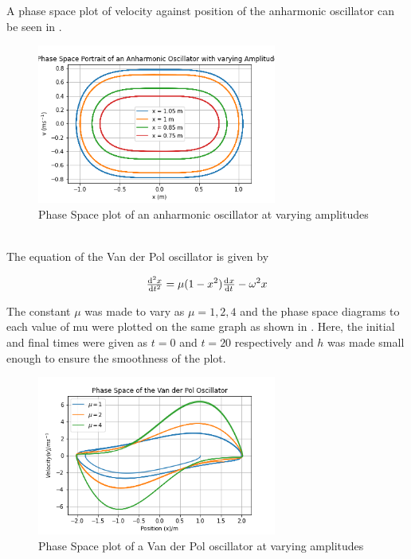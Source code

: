 \documentclass[11pt]{article}
\begin{document}
	A phase space plot of velocity against position of the anharmonic oscillator can be seen in .
	\begin{figure}[!h]\begin{center} 
			\vspace{12pt}
			\includegraphics[width=0.7\textwidth]{phase_space.png} 
			\caption{Phase Space plot of an anharmonic oscillator at varying amplitudes }
			\label{fig:phase_space} 
		\end{center}
	\end{figure}
\\
	The equation of the Van der Pol oscillator is given by
	
	\begin{equation}
		\od[2]{x}{t} = \mu (1-x^{2})\od{x}{t} - \omega^{2} x
	\end{equation}



	The constant $\mu$ was made to vary as $\mu = 1, 2, 4$ and the phase space diagrams to each value of mu were plotted on the same graph as shown in . Here, the initial and final times were given as $t=0$ and $t=20$ respectively and $h$ was made small enough to ensure the smoothness of the plot. 
	\begin{figure}[!h]\begin{center} 
			\vspace{12pt}
			\includegraphics[width=0.7\textwidth]{vanderpol.png} 
			\caption{Phase Space plot of a Van der Pol oscillator at varying amplitudes }
			\label{fig:vanderpol} 
		\end{center}
	\end{figure}
	
\end{document}
